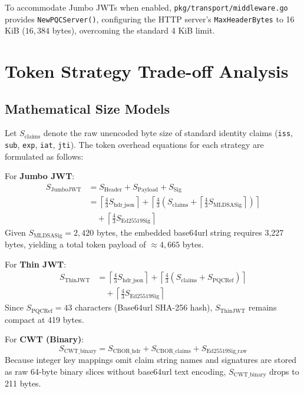 \documentclass{article}
\begin{document}
\begin{IEEEkeywords}
To accommodate Jumbo JWTs when enabled, \texttt{pkg/transport/middleware.go} provides \texttt{NewPQCServer()}, configuring the HTTP server's \texttt{MaxHeaderBytes} to 16 KiB ($16,384$ bytes), overcoming the standard 4 KiB limit.

\section{Token Strategy Trade-off Analysis}

\subsection{Mathematical Size Models}
Let $S_{\text{claims}}$ denote the raw unencoded byte size of standard identity claims (\texttt{iss}, \texttt{sub}, \texttt{exp}, \texttt{iat}, \texttt{jti}). The token overhead equations for each strategy are formulated as follows:

For \textbf{Jumbo JWT}:
\begin{align}
S_{\text{JumboJWT}} &= S_{\text{Header}} + S_{\text{Payload}} + S_{\text{Sig}} \nonumber \\
&= \left\lceil \frac{4}{3} S_{\text{hdr\_json}} \right\rceil + \left\lceil \frac{4}{3} \left( S_{\text{claims}} + \left\lceil \frac{4}{3} S_{\text{MLDSASig}} \right\rceil \right) \right\rceil \nonumber \\
&\quad + \left\lceil \frac{4}{3} S_{\text{Ed25519Sig}} \right\rceil
\end{align}
Given $S_{\text{MLDSASig}} = 2,420$ bytes, the embedded base64url string requires 3,227 bytes, yielding a total token payload of $\approx 4,665$ bytes.

For \textbf{Thin JWT}:
\begin{align}
S_{\text{ThinJWT}} &= \left\lceil \frac{4}{3} S_{\text{hdr\_json}} \right\rceil + \left\lceil \frac{4}{3} \left( S_{\text{claims}} + S_{\text{PQCRef}} \right) \right\rceil \nonumber \\
&\quad + \left\lceil \frac{4}{3} S_{\text{Ed25519Sig}} \right\rceil
\end{align}
Since $S_{\text{PQCRef}} = 43$ characters (Base64url SHA-256 hash), $S_{\text{ThinJWT}}$ remains compact at 419 bytes.

For \textbf{CWT (Binary)}:
\begin{equation}
S_{\text{CWT\_binary}} = S_{\text{CBOR\_hdr}} + S_{\text{CBOR\_claims}} + S_{\text{Ed25519Sig\_raw}}
\end{equation}
Because integer key mappings omit claim string names and signatures are stored as raw 64-byte binary slices without base64url text encoding, $S_{\text{CWT\_binary}}$ drops to 211 bytes.


\end{IEEEkeywords}
\end{document}
